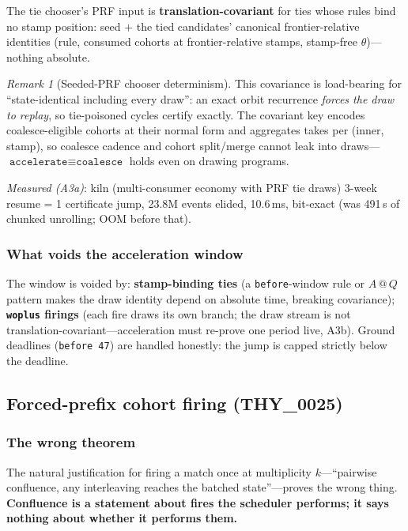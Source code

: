 \documentclass[11pt]{article}
\makeatletter
\newcommand{\stmp}[2]{#1\mathbin{@}#2}           %
\theoremstyle{definition}
\theoremstyle{remark}
\newtheorem{remark}[theorem]{Remark}
\makeatother
\begin{document}
The tie chooser's PRF input is \textbf{translation-covariant} for ties whose rules
bind no stamp position: seed $+$ the tied candidates' canonical frontier-relative
identities (rule, consumed cohorts at frontier-relative stamps, stamp-free
$\theta$)---nothing absolute.

\begin{remark}[Seeded-PRF chooser determinism]
\label{rem:prf-det}
This covariance is load-bearing for ``state-identical including every draw'': an
exact orbit recurrence \emph{forces the draw to replay}, so tie-poisoned cycles
certify exactly.  The covariant key encodes coalesce-eligible cohorts at their
normal form and aggregates takes per (inner, stamp), so coalesce cadence and cohort
split/merge cannot leak into draws---$\texttt{accelerate} \equiv \texttt{coalesce}$
holds even on drawing programs.
\end{remark}

\textit{Measured (A3a)}: kiln (multi-consumer economy with PRF tie draws) 3-week
resume = 1 certificate jump, 23.8M events elided, 10.6\,ms, bit-exact (was
491\,s of chunked unrolling; OOM before that).

\subsubsection*{What voids the acceleration window}

The window is voided by: \textbf{stamp-binding ties} (a \texttt{before}-window
rule or $\stmp{A}{Q}$ pattern makes the draw identity depend on absolute time,
breaking covariance); \textbf{\texttt{woplus} firings} (each fire draws its own
branch; the draw stream is not translation-covariant---acceleration must re-prove
one period live, A3b).  Ground deadlines (\texttt{before 47}) are handled
honestly: the jump is capped strictly below the deadline.

\subsection{Forced-prefix cohort firing (THY\_0025)}
\label{subsec:cohort-firing}

\subsubsection*{The wrong theorem}

The natural justification for firing a match once at multiplicity
$k$---``pairwise confluence, any interleaving reaches the batched state''---proves
the wrong thing.  \textbf{Confluence is a statement about fires the scheduler
performs; it says nothing about whether it performs them.}
\end{document}
